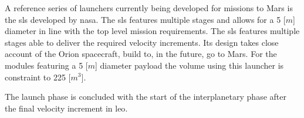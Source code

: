 A reference series of launchers currently being developed for missions to Mars is the \acrfull{sls} developed by \gls{nasa}. The \gls{sls} features multiple stages and allows for a 5 [$m$] diameter in line with the top level mission requirements. The \gls{sls} features multiple stages able to deliver the required velocity increments. Its design takes close account of the Orion spacecraft, build to, in the future, go to Mars. For the modules featuring a 5 [$m$] diameter payload the volume using this launcher is constraint to 225 [$m^3$]\cite{NASA2014}.

The launch phase is concluded with the start of the interplanetary phase after the final velocity increment in \gls{leo}. 

